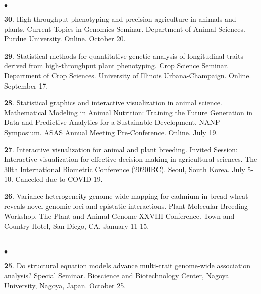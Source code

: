 \documentclass[margin,line,10pt]{res}
\newenvironment{list2}{
  \begin{list}{$\bullet$}{%
      \setlength{\itemsep}{0in}
      \setlength{\parsep}{0in} \setlength{\parskip}{0in}
      \setlength{\topsep}{0in} \setlength{\partopsep}{0in} 
      \setlength{\leftmargin}{0.2in}}}{\end{list}}
\begin{document}
\begin{resume}
\begin{list2}
  \item [{\bf 30}.] High-throughput phenotyping and precision agriculture in animals and plants. Current Topics in Genomics Seminar. Department of Animal Sciences. Purdue University. Online. October 20.

     \vspace{0.5cm}

 \item [{\bf 29}.] Statistical methods for quantitative genetic analysis of longitudinal traits derived from high-throughput plant phenotyping. Crop Science Seminar. Department of Crop Sciences. University of Illinois Urbana-Champaign. Online. September 17. 

     \vspace{0.5cm}

 \item [{\bf 28}.] Statistical graphics and interactive visualization in animal science. Mathematical Modeling in Animal Nutrition: Training the Future Generation in Data and Predictive Analytics for a Sustainable Development. NANP Symposium. ASAS Annual Meeting Pre-Conference. Online. July 19. 


  \vspace{0.5cm}


\item [{\bf 27}.] Interactive visualization for animal and plant breeding. Invited Session: Interactive visualization for effective decision-making in agricultural sciences. The 30th International Biometric Conference (2020IBC). Seoul, South Korea. July 5-10. Canceled due to COVID-19. 

  \vspace{0.5cm}
    
\item [{\bf 26}.] Variance heterogeneity genome-wide mapping for cadmium in bread wheat reveals novel genomic loci and epistatic interactions. Plant Molecular Breeding Workshop. The Plant and Animal Genome XXVIII Conference. Town and Country Hotel, San Diego, CA. January 11-15.
  
\end{list2}



\section{}
\begin{list2}

\item [{\bf 25}.] Do structural equation models advance multi-trait genome-wide association analysis? Special Seminar. Bioscience and Biotechnology Center, Nagoya University, Nagoya, Japan. October 25. 
  

\end{list2}
\end{resume}
\end{document}
